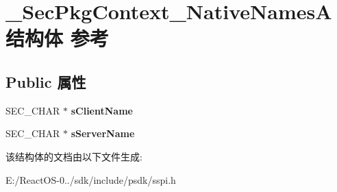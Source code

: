 \hypertarget{struct___sec_pkg_context___native_names_a}{}\section{\+\_\+\+Sec\+Pkg\+Context\+\_\+\+Native\+Names\+A结构体 参考}
\label{struct___sec_pkg_context___native_names_a}
\subsection*{Public 属性}
\begin{DoxyCompactItemize}
\item 
\mbox{\label{struct___sec_pkg_context___native_names_a_a74345ed167e6b36d781d79261b055c70}} 
S\+E\+C\+\_\+\+C\+H\+AR $\ast$ {\bfseries s\+Client\+Name}
\item 
\mbox{\label{struct___sec_pkg_context___native_names_a_a85e30dc498be4ad081ef4a815d959f82}} 
S\+E\+C\+\_\+\+C\+H\+AR $\ast$ {\bfseries s\+Server\+Name}
\end{DoxyCompactItemize}


该结构体的文档由以下文件生成\+:\begin{DoxyCompactItemize}
\item 
E\+:/\+React\+O\+S-\/0../sdk/include/psdk/sspi.\+h\end{DoxyCompactItemize}
